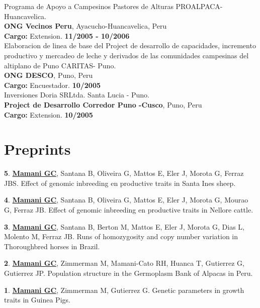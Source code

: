 \documentclass[margin,line,10pt]{res}
\newenvironment{list1}{
  \begin{list}{\ding{113}}{%
      \setlength{\itemsep}{0in}
      \setlength{\parsep}{0in} \setlength{\parskip}{0in}
      \setlength{\topsep}{0in} \setlength{\partopsep}{0in} 
      \setlength{\leftmargin}{0.17in}}}{\end{list}}
\begin{document}
\begin{resume}
Programa de Apoyo a Campesinos Pastores de Alturas PROALPACA-Huancavelica.\\
{\bf ONG Vecinos Peru}, Ayacucho-Huancavelica, Peru\\
\vspace{-.3cm}
\textbf{Cargo:} Extension.  \hfill {\bf 11/2005 - 10/2006}\\

Elaboracion de linea de base del Project de desarrollo de capacidades, incremento productivo y mercadeo de leche y derivados de las comunidades campesinas del altiplano de Puno CARITAS- Puno.\\
{\bf ONG DESCO}, Puno, Peru\\
\vspace{-.3cm}
\textbf{Cargo:} Encuestador.  \hfill {\bf 10/2005}\\

Inversiones Doria SRLtda. Santa Lucia - Puno.\\
{\bf Project de Desarrollo Corredor Puno -Cusco}, Puno, Peru\\
\vspace{-.3cm}
\textbf{Cargo:} Extension.  \hfill {\bf 10/2005}\\

\vspace{0.5cm}

\section{\sc Preprints}

\begin{list1}
\item [{\bf 5}.]  {\bf \underline{Mamani GC}}, Santana B, Oliveira G, Mattos E, Eler J, Morota G, Ferraz JBS. Effect of genomic inbreeding en productive traits in Santa Ines sheep.  
\vspace{0.5cm}
\item [{\bf 4}.]  {\bf \underline{Mamani GC}}, Santana B, Oliveira G, Mattos E, Eler J, Morota G, Mourao G, Ferraz JB. Effect of genomic inbreeding en productive traits in Nellore cattle. 
\vspace{0.5cm}
\item [{\bf 3}.]  {\bf \underline{Mamani GC}}, Santana B, Berton M, Mattos E, Eler J, Morota G, Dias L, Molento M, Ferraz JB. Runs of homozygosity and copy number variation in Thoroughbred horses in Brazil. 
\vspace{0.5cm}
\item [{\bf 2}.]  {\bf \underline{Mamani GC}}, Zimmerman M, Mamani-Cato RH, Huanca T, Gutierrez G, Gutierrez JP. Population structure in the Germoplasm Bank of Alpacas in Peru. \vspace{0.5cm}
\item [{\bf 1}.]  {\bf \underline{Mamani GC}}, Zimmerman M, Gutierrez G. Genetic parameters in growth traits in Guinea Pigs.   
\end{list1}
\vspace{0.5cm}


\end{resume}
\end{document}
